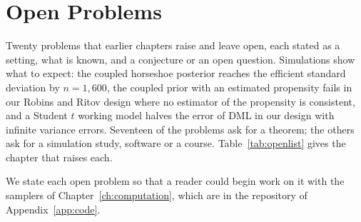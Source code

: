 \chapter{Open Problems}\label{ch:open}\label{sec:open}

\begin{tcolorbox}[colback=gray!6,colframe=gray!50,title=In brief,fonttitle=\normalfont\itshape,coltitle=black,colbacktitle=gray!15,boxrule=0.4pt,arc=1pt]
Twenty problems that earlier chapters raise and leave open, each stated as a setting, what is known, and a conjecture or an open question. Simulations show what to expect: the coupled horseshoe posterior reaches the efficient standard deviation by $n = 1{,}600$, the coupled prior with an estimated propensity fails in our Robins and Ritov design where no estimator of the propensity is consistent, and a Student $t$ working model halves the error of DML in our design with infinite variance errors. Seventeen of the problems ask for a theorem; the others ask for a simulation study, software or a course. Table~\ref{tab:openlist} gives the chapter that raises each.
\end{tcolorbox}

We state each open problem so that a reader could begin work on it with the samplers of Chapter~\ref{ch:computation}, which are in the repository of Appendix~\ref{app:code}.

